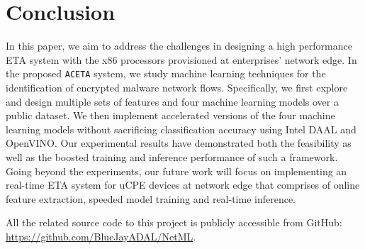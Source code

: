 \section{Conclusion}
\label{sec:concl}

In this paper, we aim to address the challenges in designing a high performance ETA system with the x86 processors provisioned at enterprises' network edge. In the proposed \texttt{ACETA} system, we study machine learning techniques for the identification of encrypted malware network flows. Specifically, we first explore and design multiple sets of features and four machine learning models over a public dataset. We then implement accelerated versions of the four machine learning models without sacrificing classification accuracy using Intel DAAL and OpenVINO. Our experimental results have demonstrated both the feasibility as well as the boosted training and inference performance of such a framework. Going beyond the experiments, our future work will focus on implementing an real-time ETA system for uCPE devices at network edge that comprises of online feature extraction, speeded model training and real-time inference.

All the related source code to this project is publicly accessible from GitHub: \url{https://github.com/BlueJayADAL/NetML}. 
